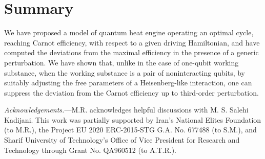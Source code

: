 \documentclass[aps,pra,floatfix,twocolumn,groupedaddress,superscriptaddress,nofootinbib,notitlepage,amsmath,amssymb,]{revtex4-1}
\begin{document}
\section{Summary}

We have proposed a model of quantum heat engine operating an optimal cycle, reaching Carnot efficiency, with respect to a given driving Hamiltonian, and have computed the deviations from the maximal efficiency in the presence of a generic perturbation. We have shown that, unlike in the case of one-qubit working substance, when the working substance is a pair of noninteracting qubits, by suitably adjusting the free parameters of a Heisenberg-like interaction, one can suppress the deviation from the Carnot efficiency up to third-order perturbation.

\textit{Acknowledgements.}---M.R. acknowledges helpful discussions with M. S. Salehi Kadijani. This work was partially supported by Iran's National Elites Foundation (to M.R.), the Project EU 2020 ERC-2015-STG G.A. No. 677488 (to S.M.), and Sharif University of Technology's Office of Vice President for Research and Technology through Grant No. QA960512 (to A.T.R.).

	
\end{document}
